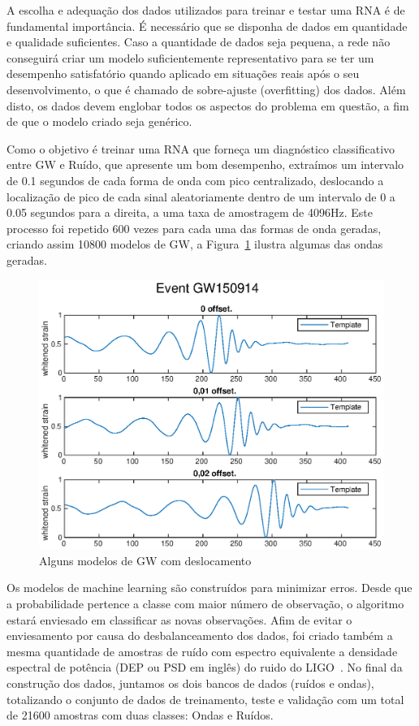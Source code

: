 A escolha e adequação dos dados utilizados para treinar e testar uma RNA é de fundamental importância. É necessário que se disponha de dados em quantidade e qualidade suficientes. Caso a quantidade de dados seja pequena, a rede não conseguirá criar um modelo suficientemente representativo para se ter um desempenho satisfatório quando aplicado em situações reais após o seu desenvolvimento, o que é chamado de sobre-ajuste (overfitting) dos dados. Além disto, os dados devem englobar todos os aspectos do problema em questão, a fim de que o modelo criado seja genérico. 

Como o objetivo é treinar uma RNA que forneça um diagnóstico classificativo entre GW e Ruído, que apresente um bom desempenho, extraímos um intervalo de 0.1 segundos de cada forma de onda com pico centralizado, deslocando a localização de pico de cada sinal aleatoriamente dentro de um intervalo de 0 a 0.05 segundos para a direita, a uma taxa de amostragem de 4096Hz. Este processo foi repetido 600 vezes para cada uma das formas de onda geradas, criando assim 10800 modelos de GW, a Figura~\ref{fig:gw150914-offset} ilustra algumas das ondas geradas.

\begin{figure}[ht]
    \centerline{\includegraphics[width=1\textwidth]{figuras/GW150914.eps}}
    \caption{Alguns modelos de GW com deslocamento}
    \label{fig:gw150914-offset}
\end{figure}

Os modelos de machine learning são construídos para minimizar erros. Desde que a probabilidade pertence a classe com maior número de observação, o algoritmo estará enviesado em classificar as novas observações. Afim de evitar o enviesamento por causa do desbalanceamento dos dados, foi criado também a mesma quantidade de amostras de ruído com espectro equivalente a densidade espectral de potência (DEP ou PSD em inglês) do ruido do LIGO~\cite{T1800044}. No final da construção dos dados, juntamos os dois bancos de dados (ruídos e ondas), totalizando o conjunto de dados de treinamento, teste e validação com um total de 21600 amostras com duas classes: Ondas e Ruídos.

